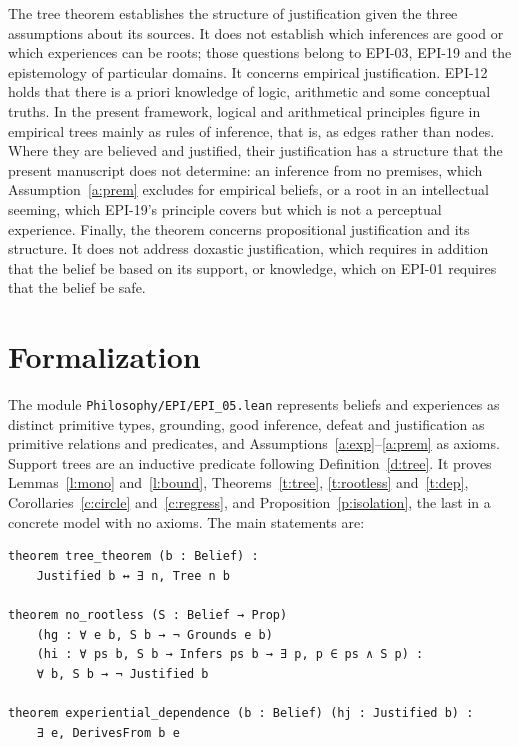 \documentclass{situationist-preprint}
\begin{document}
The tree theorem establishes the structure of justification given the three assumptions about its sources. It does not establish which inferences are good or which experiences can be roots; those questions belong to EPI-03, EPI-19 and the epistemology of particular domains. It concerns empirical justification. EPI-12 holds that there is a priori knowledge of logic, arithmetic and some conceptual truths. In the present framework, logical and arithmetical principles figure in empirical trees mainly as rules of inference, that is, as edges rather than nodes. Where they are believed and justified, their justification has a structure that the present manuscript does not determine: an inference from no premises, which Assumption~\ref{a:prem} excludes for empirical beliefs, or a root in an intellectual seeming, which EPI-19's principle covers but which is not a perceptual experience. Finally, the theorem concerns propositional justification and its structure. It does not address doxastic justification, which requires in addition that the belief be based on its support, or knowledge, which on EPI-01 requires that the belief be safe.

\section{Formalization}

The module \nolinkurl{Philosophy/EPI/EPI_05.lean} represents beliefs and experiences as distinct primitive types, grounding, good inference, defeat and justification as primitive relations and predicates, and Assumptions~\ref{a:exp}--\ref{a:prem} as axioms. Support trees are an inductive predicate following Definition~\ref{d:tree}. It proves Lemmas~\ref{l:mono} and~\ref{l:bound}, Theorems~\ref{t:tree}, \ref{t:rootless} and~\ref{t:dep}, Corollaries~\ref{c:circle} and~\ref{c:regress}, and Proposition~\ref{p:isolation}, the last in a concrete model with no axioms. The main statements are:

\begin{lstlisting}
theorem tree_theorem (b : Belief) :
    Justified b ↔ ∃ n, Tree n b

theorem no_rootless (S : Belief → Prop)
    (hg : ∀ e b, S b → ¬ Grounds e b)
    (hi : ∀ ps b, S b → Infers ps b → ∃ p, p ∈ ps ∧ S p) :
    ∀ b, S b → ¬ Justified b

theorem experiential_dependence (b : Belief) (hj : Justified b) :
    ∃ e, DerivesFrom b e
\end{lstlisting}
\end{document}
